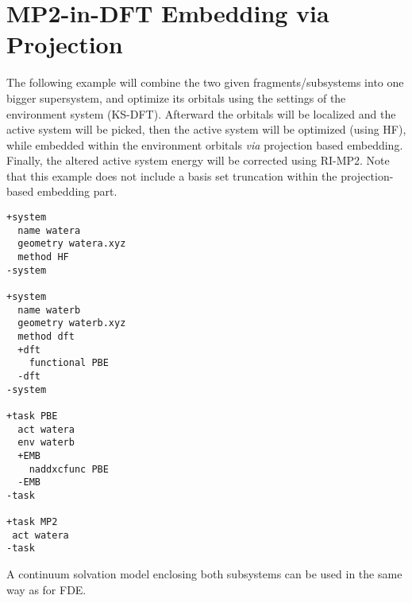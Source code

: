 \section{MP2-in-DFT Embedding via Projection}
The following example will combine the two given fragments/subsystems into one bigger supersystem, and optimize its orbitals using
the settings of the environment system (KS-DFT). Afterward the orbitals will be localized and the active system will be picked,
then the active system will be optimized (using HF), while embedded within the environment orbitals \textit{via} projection based embedding.
Finally, the altered active system energy will be corrected using RI-MP2. Note that this example does not include a basis set truncation within
the projection-based embedding part.
\begin{lstlisting}
+system
  name watera
  geometry watera.xyz
  method HF
-system

+system
  name waterb
  geometry waterb.xyz
  method dft
  +dft
    functional PBE
  -dft
-system

+task PBE
  act watera
  env waterb
  +EMB
    naddxcfunc PBE
  -EMB
-task

+task MP2
 act watera
-task

\end{lstlisting}
A continuum solvation model enclosing both subsystems can be used in the same way as for
FDE.

